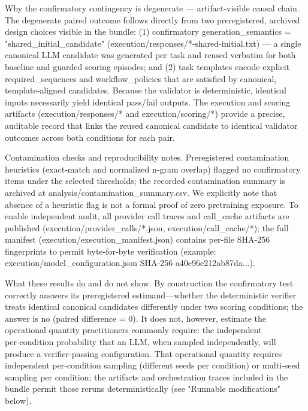 \documentclass[conference]{IEEEtran}
\begin{document}
Why the confirmatory contingency is degenerate --- artifact‑visible causal chain. The degenerate paired outcome follows directly from two preregistered, archived design choices visible in the bundle: (1) confirmatory generation\_semantics = "shared\_initial\_candidate" (execution/responses/*-shared-initial.txt) --- a single canonical LLM candidate was generated per task and reused verbatim for both baseline and guarded scoring episodes; and (2) task templates encode explicit required\_sequences and workflow\_policies that are satisfied by canonical, template‑aligned candidates. Because the validator is deterministic, identical inputs necessarily yield identical pass/fail outputs. The execution and scoring artifacts (execution/responses/* and execution/scoring/*) provide a precise, auditable record that links the reused canonical candidate to identical validator outcomes across both conditions for each pair.

Contamination checks and reproducibility notes. Preregistered contamination heuristics (exact‑match and normalized n‑gram overlap) flagged no confirmatory items under the selected thresholds; the recorded contamination summary is archived at analysis/contamination\_summary.csv. We explicitly note that absence of a heuristic flag is not a formal proof of zero pretraining exposure. To enable independent audit, all provider call traces and call\_cache artifacts are published (execution/provider\_calls/*.json, execution/call\_cache/*); the full manifest (execution/execution\_manifest.json) contains per‑file SHA‑256 fingerprints to permit byte‑for‑byte verification (example: execution/model\_configuration.json SHA‑256 a40e96e212ab87da...).

What these results do and do not show. By construction the confirmatory test correctly answers its preregistered estimand---whether the deterministic verifier treats identical canonical candidates differently under two scoring conditions; the answer is no (paired difference = 0). It does not, however, estimate the operational quantity practitioners commonly require: the independent per‑condition probability that an LLM, when sampled independently, will produce a verifier‑passing configuration. That operational quantity requires independent per‑condition sampling (different seeds per condition) or multi‑seed sampling per condition; the artifacts and orchestration traces included in the bundle permit those reruns deterministically (see "Runnable modifications" below).
\end{document}

